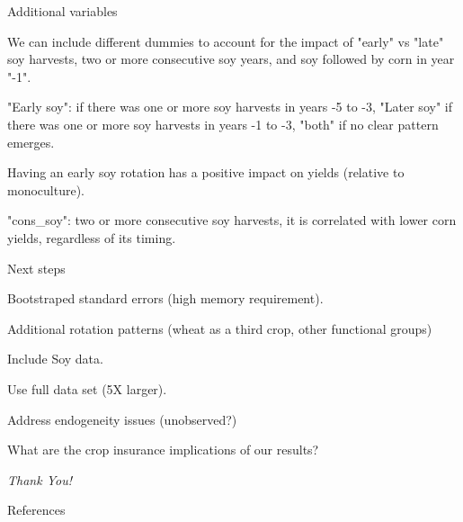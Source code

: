 \documentclass[notes,11pt, aspectratio=169]{beamer}
\newenvironment{wideitemize}{\itemize\addtolength{\itemsep}{10pt}}{\enditemize}
\begin{document}
\begin{frame}{Additional variables}
    \begin{wideitemize}
        \item We can include different dummies to account for the impact of "early" vs "late" soy harvests, two or more consecutive soy years, and soy followed by corn in year "-1".
        \item "Early soy": if there was one or more soy harvests in years -5 to -3, "Later soy" if there was one or more soy harvests in years -1 to -3, "both" if no clear pattern emerges.
        \item Having an early soy rotation has a positive impact on yields (relative to monoculture).
        \item "cons\_soy": two or more consecutive soy harvests, it is correlated with lower corn yields, regardless of its timing.
    \end{wideitemize}
\end{frame}

\begin{frame}{Next steps}
    \begin{wideitemize}
        \item Bootstraped standard errors (high memory requirement).
        \item Additional rotation patterns (wheat as a third crop, other functional groups)
        \item Include Soy data.
        \item Use full data set (5X larger).
        \item Address endogeneity issues (unobserved?)
        \item What are the crop insurance implications of our results?
    \end{wideitemize}
\end{frame}

\begin{frame}{}
	\centering \Huge
	\emph{Thank You!}
\end{frame}
	
\begin{frame}[allowframebreaks]{References}
		
\end{frame}	
\end{document}
